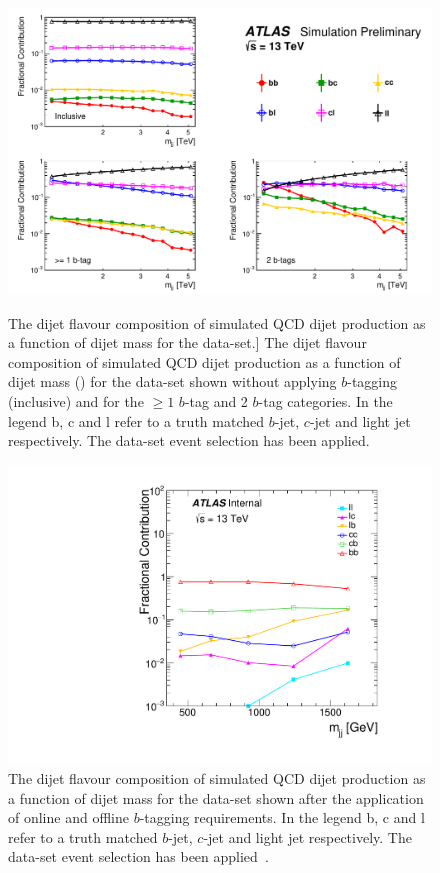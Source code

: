\begin{figure}[!hb]
  \begin{center}
    \includegraphics[width=0.9\linewidth, angle=0]{figs/Dibjet/ICHEP/evt-summer_flavcomp.pdf}
  \end{center}
  \vspace{-1.25em}
  \caption
      [The dijet flavour composition of simulated QCD dijet production as a function of dijet mass for the \summer{} data-set.]
      {The dijet flavour composition of simulated QCD dijet production as a function of dijet mass (\mjj{}) for the \summer{} data-set
        shown without applying $b$-tagging (inclusive) and for the $\geq1$ $b$-tag and 2 $b$-tag categories.
        In the legend b, c and l refer to a truth matched $b$-jet, $c$-jet and light jet respectively.
        The \summer{} data-set event selection has been applied.}
      \label{fig:evt-summer_flavcomp}
  \begin{center}
    \includegraphics[width=0.45\linewidth, angle=0]{figs/Dibjet/LowMass/evt-flavcomp.pdf}
  \end{center}
  \vspace{-1.25em}
  \caption[The dijet flavour composition of simulated QCD dijet production as a function of dijet mass for the \lm{} data-set.]
          {The dijet flavour composition of simulated QCD dijet production as a function of dijet mass for the \lm{} data-set
            shown after the application of online and offline $b$-tagging requirements.
            In the legend b, c and l refer to a truth matched $b$-jet, $c$-jet and light jet respectively.
            The \lm{} data-set event selection has been applied~\cite{dibjet-full_int}.}
  \label{fig:evt-lowmass_flavcomp}
\end{figure}


